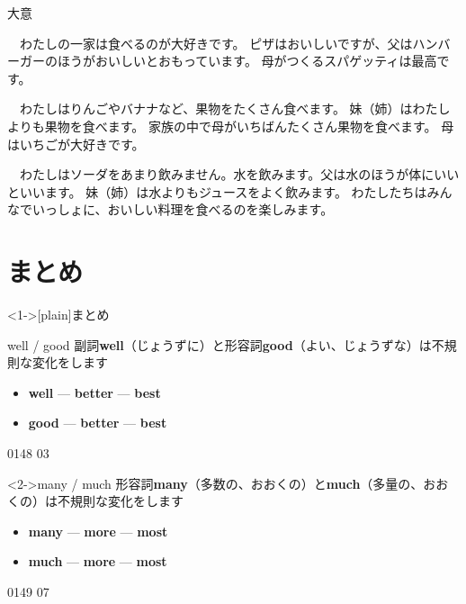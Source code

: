 \documentclass[aspectratio=169,xcolor={dvipsnames,table}]{beamer}
\begin{document}
\begin{frame}[plain]{大意}

　わたしの一家は食べるのが大好きです。
ピザはおいしいですが、父はハンバーガーのほうがおいしいとおもっています。
母がつくるスパゲッティは最高です。

　わたしはりんごやバナナなど、果物をたくさん食べます。
妹（姉）はわたしよりも果物を食べます。
 家族の中で母がいちばんたくさん果物を食べます。
母はいちごが大好きです。

　わたしはソーダをあまり飲みません。水を飲みます。父は水のほうが体にいいといいます。
妹（姉）は水よりもジュースをよく飲みます。
わたしたちはみんなでいっしょに、おいしい料理を食べるのを楽しみます。

\end{frame}
\section{まとめ}
\begin{frame}<1->[plain]{まとめ}
 \begin{block}{well / good}\small
副詞{\bfseries well}（じょうずに）と形容詞{\bfseries good}（よい、じょうずな）は不規則な変化をします%

\begin{itemize}[square]\small
 \item {\bfseries well}  --- {\bfseries better}  --- {\bfseries best} 
 \item {\bfseries good}  --- {\bfseries better} --- {\bfseries best} 
 \end{itemize}

\hfill{\tiny 0148}\,{\scriptsize {}\,{\tiny 03}}

     \end{block}

\begin{block}<2->{many / much}\small
形容詞{\bfseries many}（多数の、おおくの）と{\bfseries much}（多量の、おおくの）は不規則な変化をします%

\begin{itemize}[square]\small
 \item {\bfseries many}  --- {\bfseries more}   --- {\bfseries most}   
 \item {\bfseries much}   --- {\bfseries more}   --- {\bfseries most}   
 \end{itemize}
\hfill{\tiny 0149}\,{\scriptsize {}\,{\tiny 07}}

     \end{block}
\end{frame}
\end{document}
